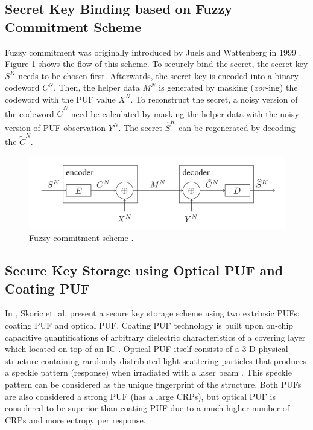 \subsection{Secret Key Binding based on Fuzzy Commitment Scheme}
Fuzzy commitment was originally introduced by Juels and Wattenberg in 1999 \cite{Juels:1999:FCS:319709.319714}. Figure \ref{fig:fuzzy_commitment} shows the flow of this scheme.
To securely bind the secret, the secret key $S^K$ needs to be chosen first. Afterwards, the secret key is encoded into a binary codeword $C^N$. Then, the helper data $M^N$ is generated by masking (\textit{xor}-ing) the codeword with the PUF value $X^N$.
To reconstruct the secret, a noisy version of the codeword $\widetilde{C}^N$ need be calculated by masking the helper data with the noisy version of PUF observation $Y^N$. The secret $\widehat{S}^K$ can be regenerated by decoding the $\widetilde{C}^N$.

\begin{figure}[tph!]
    \centerline{\includegraphics[width={\textwidth}]{images/fuzzy_commitment}}
    \caption{Fuzzy commitment scheme \cite{8006840}.}
    \label{fig:fuzzy_commitment}
\end{figure}


\subsection{Secure Key Storage using Optical PUF and Coating PUF}
In \cite{Skoric2007}, Skoric et. al. present a secure key storage scheme using two extrinsic PUFs; coating PUF and optical PUF. Coating PUF technology is built upon on-chip capacitive quantifications of arbitrary dielectric characteristics of a covering layer which located on top of an IC \cite{10.1007/11894063_29}.  Optical PUF itself consists of a 3-D physical structure containing randomly distributed light-scattering particles that produces a speckle pattern (response) when irradiated with a laser beam \cite{Skoric2007}. This speckle pattern can be considered as the unique fingerprint of the structure. Both PUFs are also considered a strong PUF (has a large CRPs), but optical PUF is considered to be superior than coating PUF due to a much higher number of CRPs and more entropy per response.

